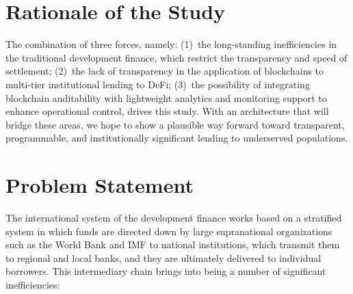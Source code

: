 \documentclass[12pt,a4paper]{report}
\begin{document}
\section{Rationale of the Study}

The combination of three forces, namely: (1)~the long-standing inefficiencies in the traditional development finance, which restrict the transparency and speed of settlement; (2)~the lack of transparency in the application of blockchains to multi-tier institutional lending to DeFi; (3)~the possibility of integrating blockchain auditability with lightweight analytics and monitoring support to enhance operational control, drives this study. With an architecture that will bridge these areas, we hope to show a plausible way forward toward transparent, programmable, and institutionally significant lending to underserved populations.

\section{Problem Statement}

The international system of the development finance works based on a stratified system in which funds are directed down by large supranational organizations such as the World Bank and IMF to national institutions, which transmit them to regional and local banks, and they are ultimately delivered to individual borrowers. This intermediary chain brings into being a number of significant inefficiencies:
\end{document}
